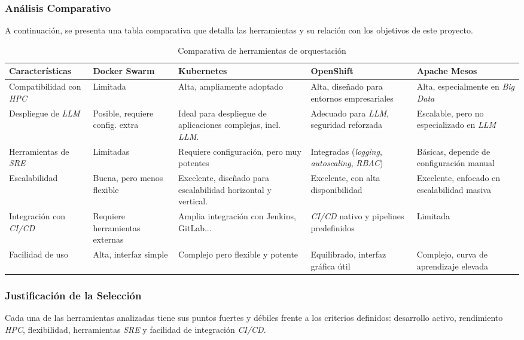 \subsubsection*{Análisis Comparativo}
A continuación, se presenta una tabla comparativa que detalla las herramientas y su relación con los objetivos de este proyecto.
\begin{table}[H]
\centering
\begin{tabular}{|p{3.5cm}|p{2.5cm}|p{2.5cm}|p{2.5cm}|p{2.5cm}|}
\hline
\textbf{Características} & \textbf{Docker Swarm} & \textbf{Kubernetes} & \textbf{OpenShift} & \textbf{Apache Mesos} \\
\hline
Compatibilidad con \textit{HPC} & Limitada & Alta, ampliamente adoptado & Alta, diseñado para entornos empresariales & Alta, especialmente en \textit{Big Data} \\
\hline
Despliegue de \textit{LLM} & Posible, requiere config. extra & Ideal para despliegue de aplicaciones complejas, incl. \textit{LLM}. & Adecuado para \textit{LLM}, seguridad reforzada & Escalable, pero no especializado en \textit{LLM} \\
\hline
Herramientas de \textit{SRE} & Limitadas & Requiere configuración, pero muy potentes & Integradas (\textit{logging}, \textit{autoscaling}, \textit{RBAC}) & Básicas, depende de configuración manual \\
\hline
Escalabilidad & Buena, pero menos flexible & Excelente, diseñado para escalabilidad horizontal y vertical. & Excelente, con alta disponibilidad & Excelente, enfocado en escalabilidad masiva \\
\hline
Integración con \textit{CI/CD} & Requiere herramientas externas & Amplia integración con Jenkins, GitLab... & \textit{CI/CD} nativo y pipelines predefinidos & Limitada \\
\hline
Facilidad de uso & Alta, interfaz simple & Complejo pero flexible y potente & Equilibrado, interfaz gráfica útil & Complejo, curva de aprendizaje elevada \\
\hline
\end{tabular}
\captionsetup{justification=centering}
\caption{Comparativa de herramientas de orquestación}
\label{tab:comparativa_orquestacion}
\end{table}

\newpage
\subsubsection*{Justificación de la Selección}
Cada una de las herramientas analizadas tiene sus puntos fuertes y débiles frente a los criterios definidos: desarrollo activo, rendimiento \textit{HPC}, flexibilidad, herramientas \textit{SRE} y facilidad de integración \textit{CI/CD}.

